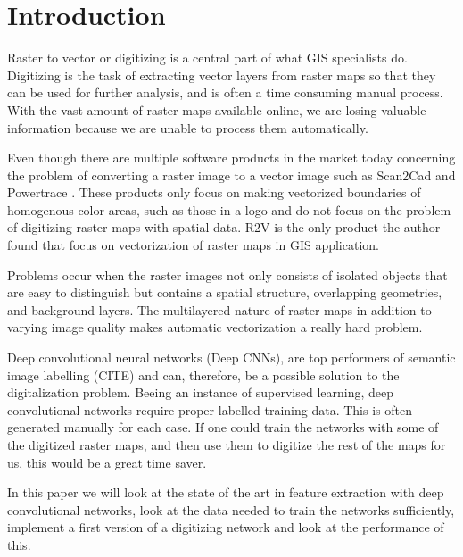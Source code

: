 \chapter{Introduction}
Raster to vector or digitizing is a central part of what GIS specialists do. Digitizing is the task of extracting vector layers from raster maps so that they can be used for further analysis, and is often a time consuming manual process. With the vast amount of raster maps available online, we are losing valuable information because we are unable to process them automatically.

Even though there are multiple software products in the market today concerning the problem of converting a raster image to a vector image such as Scan2Cad \cite{scan2cad2009} and Powertrace \cite{powertrace2016}. These products only focus on making vectorized boundaries of homogenous color areas, such as those in a logo and do not focus on the problem of digitizing raster maps with spatial data. R2V \cite{Wu1999} is the only product the author found that focus on vectorization of raster maps in GIS application. 

Problems occur when the raster images not only consists of isolated objects that are easy to distinguish but contains a spatial structure, overlapping geometries, and background layers. The multilayered nature of raster maps in addition to varying image quality makes automatic vectorization a really hard problem.

Deep convolutional neural networks (Deep CNNs), are top performers of semantic image labelling (CITE) and can, therefore, be a possible solution to the digitalization problem. Beeing an instance of supervised learning, deep convolutional networks require proper labelled training data. This is often generated manually for each case. If one could train the networks with some of the digitized raster maps, and then use them to digitize the rest of the maps for us, this would be a great time saver.

In this paper we will look at the state of the art in feature extraction with deep convolutional networks, look at the data needed to train the networks sufficiently, implement a first version of a digitizing network and look at the performance of this.

